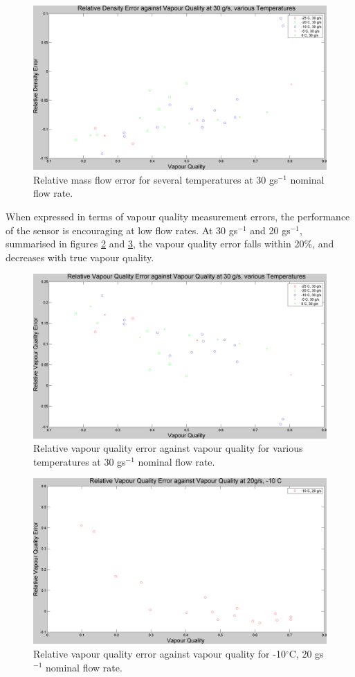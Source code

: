 \documentclass{report}
\begin{document}
\begin{figure}
\includegraphics[width=\textwidth]{plots/fig8}
\caption{Relative mass flow error for several temperatures at 30 gs$^{-1}$ nominal flow rate.}
\label{plot:8}
\end{figure}
\FloatBarrier
When expressed in terms of vapour quality measurement errors, the performance of the sensor is encouraging at low flow rates. At 30 gs$^{-1}$ and 20 gs$^{-1}$, summarised in figures \ref{plot:9} and \ref{plot:10}, the vapour quality error falls within 20\%, and decreases with true vapour quality.
\begin{figure}
\includegraphics[width=\textwidth]{plots/fig9}
\caption{Relative vapour quality error against vapour quality for various temperatures at 30 gs$^{-1}$ nominal flow rate.}
\label{plot:9}
\end{figure}
\begin{figure}
\includegraphics[width=\textwidth]{plots/fig10}
\caption{Relative vapour quality error against vapour quality for -10$^\circ$C, 20 gs$^{-1}$ nominal flow rate.}
\label{plot:10}
\end{figure}
\end{document}
